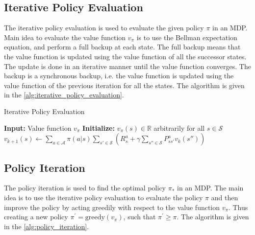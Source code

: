 \subsection{Iterative Policy Evaluation}
The iterative policy evaluation is used to evaluate the given policy \(\pi\) in an MDP. 
Main idea to evaluate the value function \(v_{\pi}\) is to use the Bellman expectation equation,
and perform a full backup at each state. The full backup means that the value function is updated
using the value function of all the successor states. The update is done in an iterative manner
until the value function converges. The backup is a synchronous backup, i.e. the value function
is updated using the value function of the previous iteration for all the states. The algorithm
is given in the \autoref{alg:iterative_policy_evaluation}.


\begin{algorithm}[H]
    \caption{Iterative Policy Evaluation}
    \label{alg:iterative_policy_evaluation}
    \begin{algorithmic}[1]
        \State \textbf{Input:} Value function $v_{\pi}$
        \State \textbf{Initialize:} $v_{\pi}(s) \in \mathbb{R}$ arbitrarily for all $s \in \mathcal{S}$
                \State $v_{k+1}(s) \leftarrow \sum\limits_{a \in \mathcal{A}} 
                    \pi(a|s) \sum\limits_{s' \in \mathcal{S}} 
                    \left( 
                        R_{s}^{a} + \gamma \sum\limits_{s'' \in \mathcal{S}}
                        P_{ss'}^{a} v_{k}(s'')   
                     \right)$
            \EndFor
        \EndWhile
    \end{algorithmic}
\end{algorithm}

\subsection{Policy Iteration}
The policy iteration is used to find the optimal policy \(\pi_{*}\) in an MDP. The main idea
is to use the iterative policy evaluation to evaluate the policy \(\pi\) and then improve the policy
by acting greedily with respect to the value function \(v_{\pi}\). Thus creating a new policy
\(\pi^{\prime}  = \text{greedy}(v_{\pi})\), such that \(\pi^{\prime} \geq \pi  \).  The algorithm is given in the \autoref{alg:policy_iteration}.


